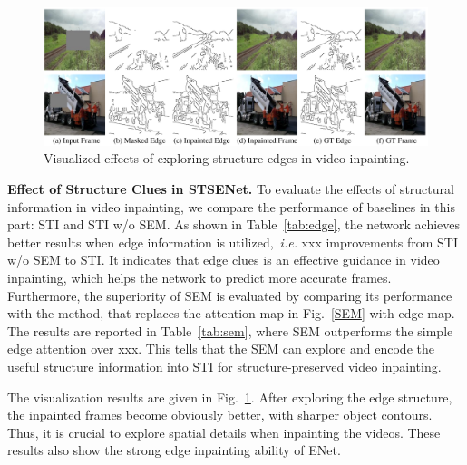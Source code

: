 \begin{figure}[t]
	\centering
	\includegraphics[width=1.0\columnwidth]{edgevis} %
	\caption{Visualized effects of exploring structure edges in video inpainting.}
	\label{edgevis}
\end{figure}


\noindent \textbf{Effect of Structure Clues in STSENet.}
To evaluate the effects of structural information in video inpainting, we compare the performance of baselines in this part: STI and STI w/o SEM.
As shown in Table~\ref{tab:edge}, the network achieves better results when edge information is utilized,~\emph{i.e.} xxx improvements from STI w/o SEM to STI. It indicates that edge clues is an effective guidance in video inpainting, which helps the network to predict more accurate frames.
Furthermore, the superiority of SEM is evaluated by comparing its performance with the method, that replaces the attention map in Fig.~\ref{SEM} with edge map.
The results are reported in Table~\ref{tab:sem}, where SEM outperforms the simple edge attention over xxx.
This tells that the SEM can explore and encode the useful structure information into STI for structure-preserved video inpainting.

The visualization results are given in Fig.~\ref{edgevis}.
After exploring the edge structure, the inpainted frames become obviously better, with sharper object contours.
Thus, it is crucial to explore spatial details when inpainting the videos.
These results also show the strong edge inpainting ability of ENet.


